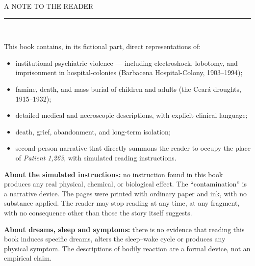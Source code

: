 \cleardoublepage
\thispagestyle{empty}
\begingroup
\setlength{\fboxsep}{8mm}
\begin{center}
{\color{sangue}\scshape\Large A NOTE TO THE READER}\\[1.2em]
{\color{sangue}\rule{0.4\paperwidth}{0.6pt}}\\[2.2em]
\end{center}

\noindent This book contains, in its fictional part, direct representations of:

\begin{itemize}
\itemsep0.4em
\item institutional psychiatric violence --- including electroshock, lobotomy, and imprisonment in hospital-colonies (Barbacena Hospital-Colony, 1903--1994);
\item famine, death, and mass burial of children and adults (the Ceará droughts, 1915--1932);
\item detailed medical and necroscopic descriptions, with explicit clinical language;
\item death, grief, abandonment, and long-term isolation;
\item second-person narrative that directly summons the reader to occupy the place of \textit{Patient 1,263}, with simulated reading instructions.
\end{itemize}

\vspace{1em}

\noindent \textbf{About the simulated instructions:} no instruction found in this book produces any real physical, chemical, or biological effect. The ``contamination'' is a narrative device. The pages were printed with ordinary paper and ink, with no substance applied. The reader may stop reading at any time, at any fragment, with no consequence other than those the story itself suggests.

\vspace{1em}

\noindent \textbf{About dreams, sleep and symptoms:} there is no evidence that reading this book induces specific dreams, alters the sleep--wake cycle or produces any physical symptom. The descriptions of bodily reaction are a formal device, not an empirical claim.

\vspace{1em}

